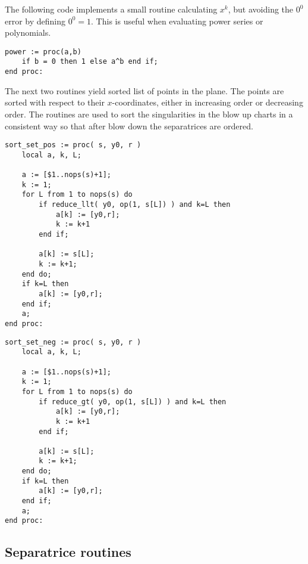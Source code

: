\documentclass[a4paper,10pt]{article}
\begin{document}
The following code implements a small routine calculating $x^k$, but avoiding the $0^0$ error by defining
$0^0 = 1$.  This is useful when evaluating power series or polynomials.

\begin{lstlisting}[name=blowup]
power := proc(a,b)
    if b = 0 then 1 else a^b end if;
end proc:
\end{lstlisting}

The next two routines yield sorted list of points in the plane.  The points are sorted with respect to their
$x$-coordinates, either in increasing order or decreasing order.  The routines are used to sort the singularities
in the blow up charts in a consistent way so that after blow down the separatrices are ordered.

\begin{lstlisting}[name=blowup]
sort_set_pos := proc( s, y0, r )
    local a, k, L;

    a := [$1..nops(s)+1];
    k := 1;
    for L from 1 to nops(s) do
        if reduce_llt( y0, op(1, s[L]) ) and k=L then
            a[k] := [y0,r];
            k := k+1
        end if;

        a[k] := s[L];
        k := k+1;
    end do;
    if k=L then
        a[k] := [y0,r];
    end if;
    a;
end proc:
\end{lstlisting}

\begin{lstlisting}[name=blowup]
sort_set_neg := proc( s, y0, r )
    local a, k, L;

    a := [$1..nops(s)+1];
    k := 1;
    for L from 1 to nops(s) do
        if reduce_gt( y0, op(1, s[L]) ) and k=L then
            a[k] := [y0,r];
            k := k+1
        end if;

        a[k] := s[L];
        k := k+1;
    end do;
    if k=L then
        a[k] := [y0,r];
    end if;
    a;
end proc:
\end{lstlisting}

\subsection{Separatrice routines}
\end{document}
